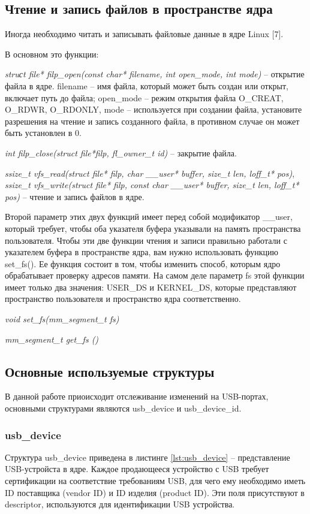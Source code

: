 \documentclass[a4paper, 10pt]{article}
\begin{document}
	\subsection{Чтение и запись файлов в пространстве ядра}
	Иногда необходимо читать и записывать файловые данные в ядре Linux [7].
	
	\hspace*{-5mm}В основном это функции: 
	
	\textit{struсt file* filp\_open(const char* filename, int open\_mode, int mode)} -- открытие файла в ядре. filename -- имя файла, который может быть создан или открыт, включает путь до файла; open\_mode -- режим открытия файла O\_CREAT, O\_RDWR, O\_RDONLY, mode -- используется при создании файла, установите разрешения на чтение и запись созданного файла, в противном случае он может быть установлен в 0.
	
	\textit{int filp\_close(struct file*filp, fl\_owner\_t id)} -- закрытие файла.
	
	\textit{ssize\_t vfs\_read(struct file* filp, char \_\_user* buffer, size\_t len, loff\_t* pos)}, \textit{ssize\_t vfs\_write(struct file* filp, const char \_\_user* buffer, size\_t len, loff\_t* pos)} -- чтение и запись файлов в ядре.
	
	Второй параметр этих двух функций имеет перед собой модификатор \_\_user, который требует, чтобы оба указателя буфера указывали на память пространства пользователя. Чтобы эти две функции чтения и записи правильно работали с указателем буфера в пространстве ядра, вам нужно использовать функцию set\_fs(). Ее функция состоит в том, чтобы изменить способ, которым ядро обрабатывает проверку адресов памяти. На самом деле параметр fs этой функции имеет только два значения: USER\_DS и KERNEL\_DS, которые представляют пространство пользователя и пространство ядра соответственно.
	
	\textit{void set\_fs(mm\_segment\_t fs)}
	
	\textit{mm\_segment\_t  get\_fs ()}
	\subsection{Основные используемые структуры}
	\hspace*{5mm} В данной работе приоисходит отслеживание изменений на USB-портах, основными структурами являются usb\_device и usb\_device\_id.
	\subsubsection{usb\_device}
	\hspace*{5mm}Структура usb\_device приведена в листинге \ref{lst:usb_device} -- представление USB-устройста в ядре. Каждое продающееся устройство с USB требует сертификации на соответствие требованиям USB, для чего ему необходимо иметь ID поставщика (vendor ID) и ID изделия (product ID). Эти поля присутствуют в descriptor, используются для идентификации USB устройства.
\end{document}
